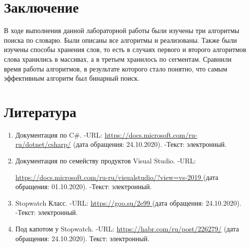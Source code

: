 \documentclass[14pt, a4paper]{extarticle}
\begin{document}
\section{Заключение}
В ходе выполнения данной лабораторной работы были изучены три алгоритмы поиска по словарю. Были описаны все алгоритмы и реализованы. Также были изучены способы хранения слов, то есть в случаях первого и второго алгоритмов слова хранились в массивах, а в третьем хранилось по сегментам. Сравнили время работы алгоритмов, в результате которого стало понятно, что самым эффективным алгоритм был бинарный поиск.
\clearpage
\section*{Литература}
\begin{enumerate}
	\label{literature}
	\item  Документация по C\#. -URL: \href{https://docs.microsoft.com/ru-ru/dotnet/csharp/}{https://docs.microsoft.com/ru-ru/dotnet/csharp/} (дата обращения: 24.10.2020). -Текст: электронный.
	\item Документация по семейству продуктов Visual Studio. -URL:\par \href{https://docs.microsoft.com/ru-ru/visualstudio/?view=vs-2019}{https://docs.microsoft.com/ru-ru/visualstudio/?view=vs-2019 } (дата обращения: 01.10.2020). -Текст: электронный.
	\item Stopwatch Класс. -URL: \href{https://goo.su/2e99}{https://goo.su/2e99 } (дата обращения: 24.10.2020). -Текст: электронный.
	\item Под капотом у Stopwatch. -URL:  \href{https://habr.com/ru/post/226279/}{https://habr.com/ru/post/226279/} (дата обращения: 24.10.2020). Текст: электронный.
\end{enumerate}
\end{document}

